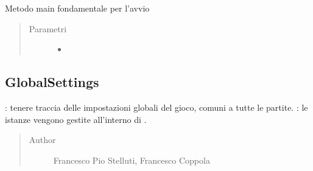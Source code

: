 \documentclass[letterpaper,10pt,italian,openany,oneside]{sphinxmanual}
\begin{document}
\begin{fulllineitems}
\label{\detokenize{source/it/unicam/cs/pa/mastermind/gamecore/ConsoleMainManager:it.unicam.cs.pa.mastermind.gamecore.ConsoleMainManager.main(String__)}}
Metodo main fondamentale per l’avvio
\begin{quote}\begin{description}
\item[{Parametri}] \leavevmode\begin{itemize}
\item {} 
 \textendash{} 

\end{itemize}

\end{description}\end{quote}

\end{fulllineitems}



\subsection{GlobalSettings}
\label{\detokenize{source/it/unicam/cs/pa/mastermind/gamecore/GlobalSettings:globalsettings}}\label{\detokenize{source/it/unicam/cs/pa/mastermind/gamecore/GlobalSettings::doc}}

\begin{fulllineitems}
\label{\detokenize{source/it/unicam/cs/pa/mastermind/gamecore/GlobalSettings:it.unicam.cs.pa.mastermind.gamecore.GlobalSettings}}
: tenere traccia delle impostazioni globali del gioco, comuni a tutte le partite. : le istanze vengono gestite all’interno di .
\begin{quote}\begin{description}
\item[{Author}] \leavevmode
Francesco Pio Stelluti, Francesco Coppola

\end{description}\end{quote}

\end{fulllineitems}
\end{document}
